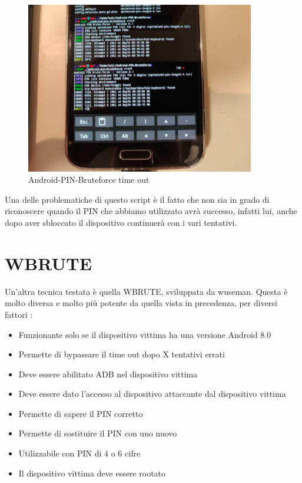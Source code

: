 \begin{figure}[h!]
    \centering
    \includegraphics[width=100mm]{Immagini/3/time_out.png}
    \caption{Android-PIN-Bruteforce time out}
    \label{fig:Android-PIN-Bruteforce}
\end{figure}

Una delle problematiche di questo script è il fatto che non sia in grado di riconoscere quando il PIN che abbiamo utilizzato avrà successo, infatti lui, anche dopo aver sbloccato il dispositivo continuerà con i vari tentativi.

\section{WBRUTE}

Un’altra tecnica testata è quella WBRUTE\cite{wbrute}, sviluppata da wuseman. Questa è molto diversa e molto più potente da quella vista in precedenza, per diversi fattori :

\begin{itemize}
	\item Funzionante solo se il dispositivo vittima ha una versione Android 8.0
	\item Permette di bypassare il time out dopo X tentativi errati
	\item Deve essere abilitato ADB nel dispositivo vittima
	\item Deve essere dato l’accesso al dispositivo attaccante dal dispositivo vittima
	\item Permette di sapere il PIN corretto
	\item Permette di sostituire il PIN con uno nuovo
	\item Utilizzabile con PIN di 4 o 6 cifre
	\item Il dispositivo vittima deve essere rootato
\end{itemize}

